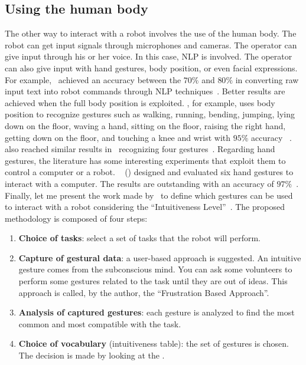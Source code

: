 \documentclass[../thesis.tex]{subfiles}
\begin{document}
\subsection{Using the human body}
The other way to interact with a robot involves the use of the human body. The robot can get input signals through microphones and cameras. The operator can give input through his or her voice. In this case,  \acrfull{NLP} is involved. The operator can also give input with hand gestures, body position, or even facial expressions. For example,~\citeauthor{paper:commanding_a_robot_with_NLP} achieved an accuracy between the $70\%$ and $80\%$ in converting raw input text into robot commands through \acrshort{NLP} techniques~\cite{paper:commanding_a_robot_with_NLP}. Better results are achieved when the full body position is exploited. \citeauthor{paper:example_full_body_gesture1}, for example, uses body position to recognize gestures such as walking, running, bending, jumping, lying down on the floor, waving a hand, sitting on the floor, raising the right hand, getting down on the floor, and touching a knee and wrist with $95\%$ accuracy ~\cite{paper:example_full_body_gesture1}.~\citeauthor{paper:example_full_body_gesture2} also reached similar results in~\citeyear{paper:example_full_body_gesture2} recognizing four gestures~\cite{paper:example_full_body_gesture2}. Regarding hand gestures, the literature has some interesting experiments that exploit them to control a computer or a robot. ~\citeauthor{paper:design_and_evaluate_hand_gesture} (\citeyear{paper:design_and_evaluate_hand_gesture}) designed and evaluated six hand gestures to interact with a computer. The results are outstanding with an accuracy of $97\%$~\cite{paper:design_and_evaluate_hand_gesture}. Finally, let me present the work made by~\citeauthor{paper:intuitiveness_level} to define which gestures can be used to interact with a robot considering the ``Intuitiveness Level''~\cite{paper:intuitiveness_level}. The proposed methodology is composed of four steps:
\begin{enumerate}
    \item \textbf{Choice of tasks}: select a set of tasks that the robot will perform.
    \item \textbf{Capture of gestural data}: a user-based approach is suggested. An intuitive gesture comes from the subconscious mind. You can ask some volunteers to perform some gestures related to the task until they are out of ideas. This approach is called, by the author, the ``Frustration Based Approach''.
    \item \textbf{Analysis of captured gestures}: each gesture is analyzed to find the most common and most compatible with the task.
    \item \textbf{Choice of vocabulary} (intuitiveness table): the set of gestures is chosen. The decision is made by looking at the .
\end{enumerate}
\end{document}
